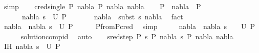 \begin{isabellebody}
\ simp\isanewline
{}\isamarkupfalse%
\isanewline
\ \ \isamarkupfalse%
\ {\isacharparenleft}{\kern0pt}cred{\isacharunderscore}{\kern0pt}single\ P{}\ nabla\ P{}\ nabla{}\ nabla{}{\isacharparenright}{\kern0pt}\isanewline
\ \ \isamarkupfalse%
\ {\isachardoublequoteopen}P{}\ {\isasymturnstile}\ nabla\ {\isasymrightarrow}\ P{}{\isachardoublequoteclose}\isanewline
\ \ \ \ \ \ {\isachardoublequoteopen}{\isacharparenleft}{\kern0pt}nabla{}{\isacharcomma}{\kern0pt}\ s{}{\isacharparenright}{\kern0pt}\ {\isasymin}\ U\ P{}{\isachardoublequoteclose}\ \isanewline
\ \ \ \ \ \ {\isachardoublequoteopen}nabla{}\ {\isasymTurnstile}\ {\isacharparenleft}{\kern0pt}subst\ s{}{\isacharparenright}{\kern0pt}\ nabla{\isachardoublequoteclose}\ \isamarkupfalse%
\ fact{\isacharplus}{\kern0pt}\isanewline
\ \ \isamarkupfalse%
\ {\isachardoublequoteopen}{\isacharparenleft}{\kern0pt}nabla{}\ {\isasymunion}\ nabla{}{\isacharcomma}{\kern0pt}\ s{}{\isacharparenright}{\kern0pt}\ {\isasymin}\ U\ P{}{\isachardoublequoteclose}\isanewline
\ \ \ \ \isamarkupfalse%
\ P{}{\isacharunderscore}{\kern0pt}from{\isacharunderscore}{\kern0pt}P{}{\isacharunderscore}{\kern0pt}cred\ \isamarkupfalse%
\ simp\isanewline
\ \ \isamarkupfalse%
\ \isamarkupfalse%
\ {\isachardoublequoteopen}{\isacharparenleft}{\kern0pt}nabla{}\ {\isasymunion}\ nabla{}{\isacharcomma}{\kern0pt}\ s{}\ {\isasymbullet}\ {\isacharbrackleft}{\kern0pt}{\isacharbrackright}{\kern0pt}{\isacharparenright}{\kern0pt}\ {\isasymin}\ U\ P{}{\isachardoublequoteclose}\isanewline
\ \ \ \ \isamarkupfalse%
\ solution{\isacharunderscore}{\kern0pt}comp{\isacharunderscore}{\kern0pt}id\ \isamarkupfalse%
\ auto\isanewline
{}\isamarkupfalse%
\isanewline
\ \ \isamarkupfalse%
\ {\isacharparenleft}{\kern0pt}sred{\isacharunderscore}{\kern0pt}step\ P{}\ s\ P{}\ nabla{}\ s{}\ P{}\ nabla{}\ nabla{}{\isacharparenright}{\kern0pt}\isanewline
\ \ \isamarkupfalse%
\ IH{\isacharcolon}{\kern0pt}\ {\isachardoublequoteopen}{\isacharparenleft}{\kern0pt}nabla{}{\isacharcomma}{\kern0pt}\ s{}{\isacharparenright}{\kern0pt}\ {\isasymin}\ U\ P{}\ {\isasymLongrightarrow}\isanewline

\end{isabellebody}
